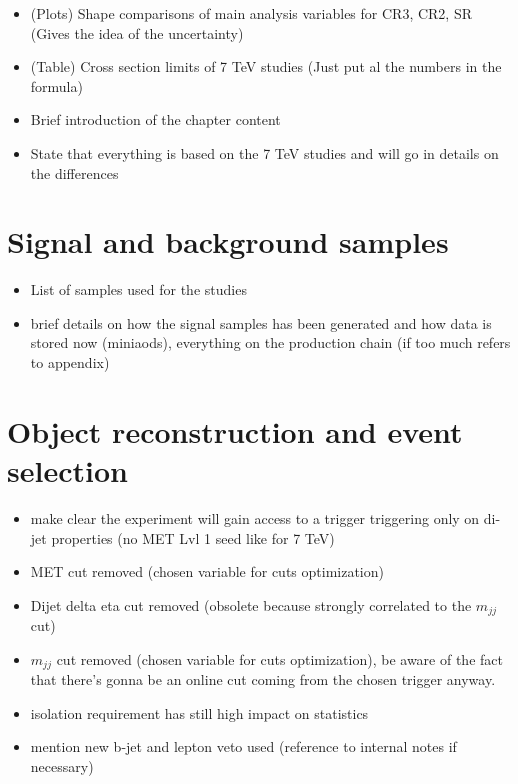 
\begin{itemize}
	\item (Plots) Shape comparisons of main analysis variables for CR3, CR2, SR (Gives the idea of the uncertainty)
	\item (Table) Cross section limits of 7 TeV studies (Just put al the numbers in the formula)
\end{itemize}


\begin{itemize}
	\item Brief introduction of the chapter content
	\item State that everything is based on the 7 TeV studies and will go in details on the differences
\end{itemize}


\section{Signal and background samples}

\begin{itemize}
	\item List of samples used for the studies
	\item brief details on how the signal samples has been generated and how data is stored now (miniaods), everything on the production chain (if too much refers to appendix)
\end{itemize}



\section{Object reconstruction and event selection}
\begin{itemize}
	\item make clear the experiment will gain access to a trigger triggering only on di-jet properties (no MET Lvl 1 seed like for 7 TeV)
	\item MET cut removed (chosen variable for cuts optimization)
	\item Dijet delta eta cut removed (obsolete because strongly correlated to the $m_{jj}$ cut) 
	\item $m_{jj}$ cut removed (chosen variable for cuts optimization), be aware of the fact that there's gonna be an online cut coming from the chosen trigger anyway.
	\item \hadtau isolation requirement has still high impact on statistics
	\item mention new b-jet and lepton veto used (reference to internal notes if necessary)
\end{itemize}

